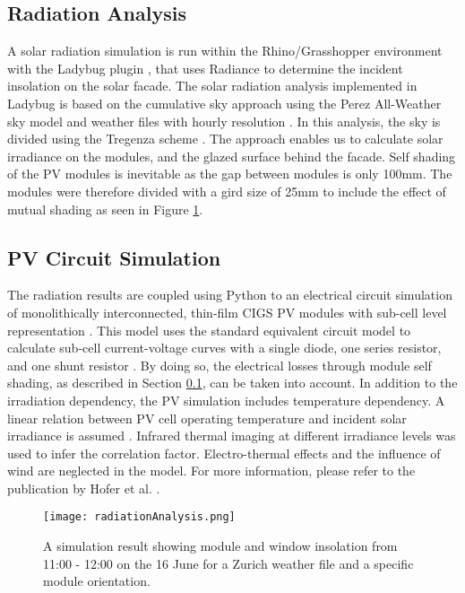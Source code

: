 \subsection{Radiation Analysis}
\label{ch:rad}
A solar radiation simulation is run within the Rhino/Grasshopper environment \cite{grasshopper} with the Ladybug plugin \cite{roudsari2013ladybug},  that uses Radiance \cite{ward1994radiance} to determine the incident insolation on the solar facade. The solar radiation analysis implemented in Ladybug is based on the cumulative sky approach \cite{robinson2004irradiation} using the Perez All-Weather sky model and weather files with hourly resolution \cite{perez1993all}. In this analysis, the sky is divided using the Tregenza scheme \cite{tregenza1987subdivision}. The approach enables us to calculate solar irradiance on the modules, and the glazed surface behind the facade. Self shading of the PV modules is inevitable as the gap between modules is only 100mm. The modules were therefore divided with a gird size of 25mm to include the effect of mutual shading as seen in Figure \ref{fig:radiation2}.
  

\subsection{PV Circuit Simulation}

The radiation results are coupled using Python to an electrical circuit simulation of monolithically interconnected, thin-film CIGS PV modules with sub-cell level representation \cite{hofer2016parametric,python}. This model uses the standard equivalent circuit model to calculate sub-cell current-voltage curves with a single diode, one series resistor, and one shunt resistor \cite{mermoud2010}. By doing so, the electrical losses through module self shading, as described in Section \ref{ch:rad}, can be taken into account. In addition to the irradiation dependency, the PV simulation includes temperature dependency. A linear relation between PV cell operating temperature and incident solar irradiance is assumed \cite{skoplaki2009operating}. Infrared thermal imaging at different irradiance levels was used to infer the correlation factor. Electro-thermal effects and the influence of wind are neglected in the model. For more information, please refer to the publication by Hofer et al. \cite{hofer2016parametric}.


\begin{figure}
\begin{center}
\texttt{[image: radiationAnalysis.png]}
\caption{A simulation result showing module and window insolation from 11:00 - 12:00 on the 16 June for a Zurich weather file and a specific module orientation.}
\label{fig:radiation2}
\end{center}
\end{figure}


